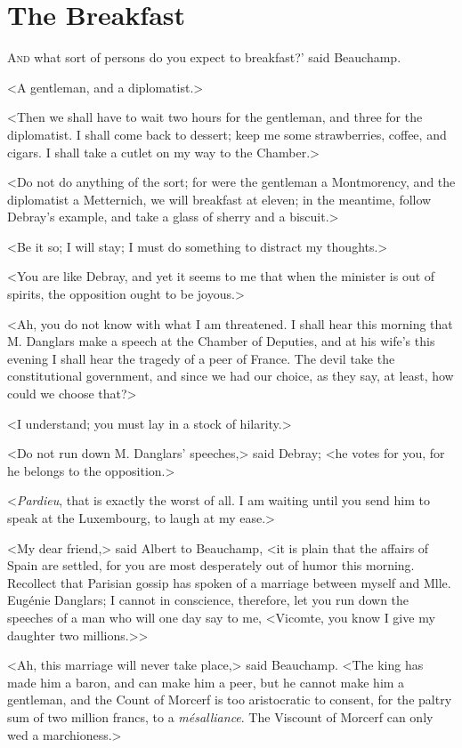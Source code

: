 \chapter{The Breakfast} 

 \lettrine[ante=']{A}{nd} what sort of persons do you expect to breakfast?' said Beauchamp. 

 <A gentleman, and a diplomatist.> 

 <Then we shall have to wait two hours for the gentleman, and three for the diplomatist. I shall come back to dessert; keep me some strawberries, coffee, and cigars. I shall take a cutlet on my way to the Chamber.> 

 <Do not do anything of the sort; for were the gentleman a Montmorency, and the diplomatist a Metternich, we will breakfast at eleven; in the meantime, follow Debray's example, and take a glass of sherry and a biscuit.> 

 <Be it so; I will stay; I must do something to distract my thoughts.> 

 <You are like Debray, and yet it seems to me that when the minister is out of spirits, the opposition ought to be joyous.> 

 <Ah, you do not know with what I am threatened. I shall hear this morning that M. Danglars make a speech at the Chamber of Deputies, and at his wife's this evening I shall hear the tragedy of a peer of France. The devil take the constitutional government, and since we had our choice, as they say, at least, how could we choose that?> 

 <I understand; you must lay in a stock of hilarity.> 

 <Do not run down M. Danglars' speeches,> said Debray; <he votes for you, for he belongs to the opposition.> 

 <\textit{Pardieu}, that is exactly the worst of all. I am waiting until you send him to speak at the Luxembourg, to laugh at my ease.> 

 <My dear friend,> said Albert to Beauchamp, <it is plain that the affairs of Spain are settled, for you are most desperately out of humor this morning. Recollect that Parisian gossip has spoken of a marriage between myself and Mlle. Eugénie Danglars; I cannot in conscience, therefore, let you run down the speeches of a man who will one day say to me, <Vicomte, you know I give my daughter two millions.>> 

 <Ah, this marriage will never take place,> said Beauchamp. <The king has made him a baron, and can make him a peer, but he cannot make him a gentleman, and the Count of Morcerf is too aristocratic to consent, for the paltry sum of two million francs, to a \textit{mésalliance}. The Viscount of Morcerf can only wed a marchioness.> 

